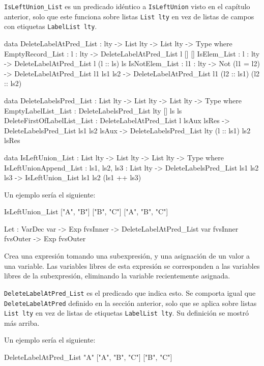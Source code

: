 \texttt{IsLeftUnion\_List} es un predicado idéntico a \texttt{IsLeftUnion} visto en el capítulo anterior, solo que este funciona sobre listas \texttt{List lty} en vez de listas de campos con etiquetas \texttt{LabelList lty}.

\begin{code}
data DeleteLabelAtPred_List : lty -> List lty -> 
  List lty -> Type where
  EmptyRecord_List : {l : lty} -> DeleteLabelAtPred_List l [] []
  IsElem_List : {l : lty} -> DeleteLabelAtPred_List l (l :: ls) ls
  IsNotElem_List : {l1 : lty} -> Not (l1 = l2) -> 
    DeleteLabelAtPred_List l1 ls1 ls2 -> 
    DeleteLabelAtPred_List l1 (l2 :: ls1) (l2 :: ls2)

data DeleteLabelsPred_List : List lty -> List lty -> 
  List lty -> Type where
  EmptyLabelList_List : DeleteLabelsPred_List {lty} [] ls ls
  DeleteFirstOfLabelList_List : DeleteLabelAtPred_List l lsAux lsRes -> 
    DeleteLabelsPred_List ls1 ls2 lsAux ->
    DeleteLabelsPred_List {lty} (l :: ls1) ls2 lsRes

data IsLeftUnion_List : List lty -> List lty -> 
  List lty -> Type where
  IsLeftUnionAppend_List : 
    {ls1, ls2, ls3 : List lty} -> 
    DeleteLabelsPred_List ls1 ls2 ls3 -> 
    IsLeftUnion_List ls1 ls2 (ls1 ++ ls3)
\end{code}

Un ejemplo sería el siguiente:

\begin{code}
IsLeftUnion_List ["A", "B"] ["B", "C"] 
  ["A", "B", "C"]
\end{code}

\begin{code}
Let : VarDec var -> Exp fvsInner -> 
    DeleteLabelAtPred_List var fvsInner fvsOuter -> 
    Exp fvsOuter
\end{code}

Crea una expresión tomando una subexpresión, y una asignación de un valor a una variable. Las variables libres de esta expresión se corresponden a las variables libres de la subexpresión, eliminando la variable recientemente asignada.

\texttt{DeleteLabelAtPred\_List} es el predicado que indica esto. Se comporta igual que \texttt{DeleteLabelAtPred} definido en la sección anterior, solo que se aplica sobre listas \texttt{List lty} en vez de listas de etiquetas \texttt{LabelList lty}. Su definición se mostró más arriba.

Un ejemplo sería el siguiente:

\begin{code}
DeleteLabelAtPred_List "A" ["A", "B", "C"]
  ["B", "C"]
\end{code}

